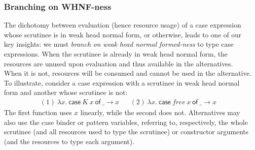 \documentclass[acmsmall,review]{acmart}
\newcommand{\ccase}[2]{\mathsf{case}~#1~\mathsf{of}~#2}
\begin{document}
\subsubsection{Branching on WHNF-ness}

The dichotomy between evaluation (hence resource usage) of a case expression
whose scrutinee is in weak head normal form, or otherwise, leads to one of our
key insights: we must \emph{branch on weak head normal formed-ness} to
type case expressions.
%
When the scrutinee is already in weak head normal form, the resources are
unused upon evaluation and thus available in the alternatives.
%
When it is not, resources will be consumed and cannot be used in the
alternative.
%
To illustrate, consider a case expression with a scrutinee in weak head normal
form and another whose scrutinee is not:
\[
\begin{array}{ccc}
(1)~\lambda x.~\ccase{K~x}{\_ \to x} &  & (2)~\lambda x.~\ccase{free~x}{\_ \to x}
\end{array}
\]
The first function uses $x$ linearly, while the second does not.
%
Alternatives may also use the case binder or pattern variables, referring to, respectively,
the whole scrutinee (and all resources used to type the scrutinee) or
constructor arguments (and the resources to type each argument).
\end{document}
